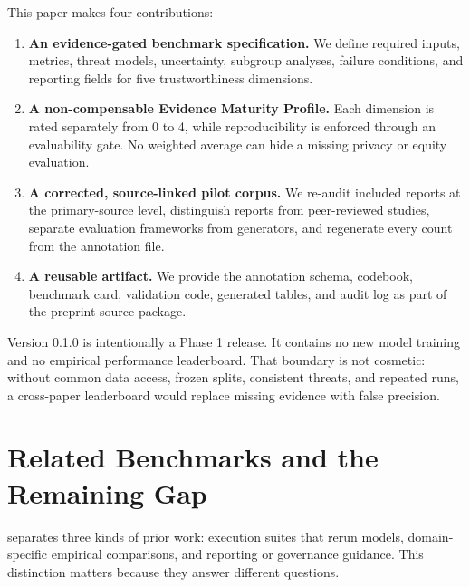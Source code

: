 \documentclass[11pt,letterpaper]{article}
\begin{document}
This paper makes four contributions:

\begin{enumerate}
    \item \textbf{An evidence-gated benchmark specification.} We define required inputs, metrics, threat models, uncertainty, subgroup analyses, failure conditions, and reporting fields for five trustworthiness dimensions.
    \item \textbf{A non-compensable Evidence Maturity Profile.} Each dimension is rated separately from 0 to 4, while reproducibility is enforced through an evaluability gate. No weighted average can hide a missing privacy or equity evaluation.
    \item \textbf{A corrected, source-linked pilot corpus.} We re-audit \CorpusN{} included reports at the primary-source level, distinguish reports from peer-reviewed studies, separate evaluation frameworks from generators, and regenerate every count from the annotation file.
    \item \textbf{A reusable artifact.} We provide the annotation schema, codebook, benchmark card, validation code, generated tables, and audit log as part of the preprint source package.
\end{enumerate}

Version 0.1.0 is intentionally a Phase 1 release. It contains no new model training and no empirical performance leaderboard. That boundary is not cosmetic: without common data access, frozen splits, consistent threats, and repeated runs, a cross-paper leaderboard would replace missing evidence with false precision.

\section{Related Benchmarks and the Remaining Gap}
\label{sec:related}

 separates three kinds of prior work: execution suites that rerun models, domain-specific empirical comparisons, and reporting or governance guidance. This distinction matters because they answer different questions.
\end{document}
